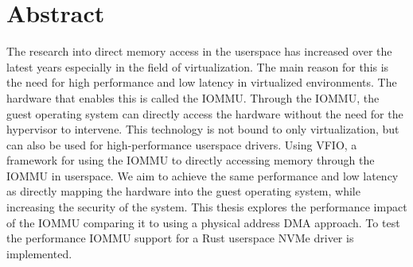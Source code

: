 \chapter{Abstract}

The research into direct memory access in the userspace has increased over the latest years especially in the field of virtualization.
The main reason for this is the need for high performance and low latency in virtualized environments.
The hardware that enables this is called the IOMMU. Through the IOMMU, the guest operating system can directly access the hardware without the need for the hypervisor to intervene.
This technology is not bound to only virtualization, but can also be used for high-performance userspace drivers.
Using VFIO, a framework for using the IOMMU to directly accessing memory through the IOMMU in userspace.
We aim to achieve the same performance and low latency as directly mapping the hardware into the guest operating system, while increasing the security of the system.
This thesis explores the performance impact of the IOMMU comparing it to using a physical address DMA approach. To test the performance IOMMU support for a Rust userspace NVMe driver is implemented.
